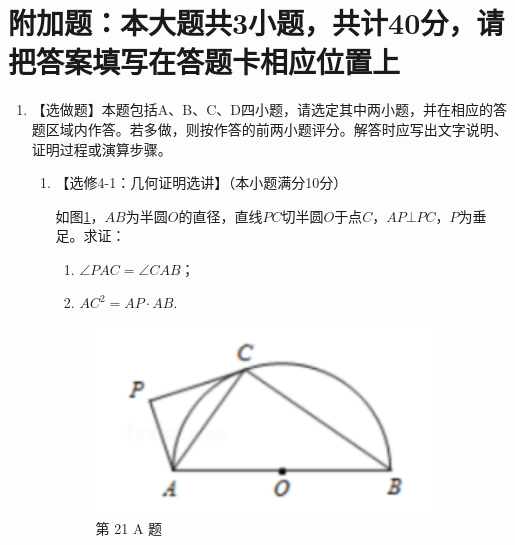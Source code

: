 \documentclass[12pt,space]{ctexart} %
\begin{document}
\section{附加题：本大题共3小题，共计40分，请把答案填写在答题卡相应位置上}
\begin{enumerate}[itemsep=-0.3em,topsep=0pt,resume]
  \item 【选做题】本题包括A、B、C、D四小题，请选定其中两小题，并在相应的答题区域内作答。若多做，则按作答的前两小题评分。解答时应写出文字说明、证明过程或演算步骤。
  \begin{enumerate}[itemsep=-0.3em,label={\Alph*.},topsep=0pt,labelsep=.5em,leftmargin=1.7em]
    \item 【选修4-1：几何证明选讲】（本小题满分10分）\\[0.5em] 
      \begin{minipage}[h][20ex][t]{.65\textwidth}
        如图\ref{fig:t21A}，$AB$为半圆$O$的直径，直线$PC$切半圆$O$于点$C$，$AP\bot PC$，$P$为垂足。求证：
        \begin{enumerate}[itemsep=-0.3em,label={(\arabic*)},topsep=0pt,labelsep=.5em,leftmargin=1.7em]
          \item $\angle PAC=\angle CAB$；
          \item $AC^2=AP\cdot AB$. 
        \end{enumerate}
      \end{minipage}
      \begin{minipage}[h][20ex][b]{.32\textwidth}
        \begin{figure}[H]
          \centering
          \includegraphics[width=0.9\textwidth]{Image/js-21-A.png}
          \caption{第 21 A 题}\label{fig:t21A}
        \end{figure}
      \end{minipage}
    

\end{enumerate}
\end{enumerate}
\end{document}
